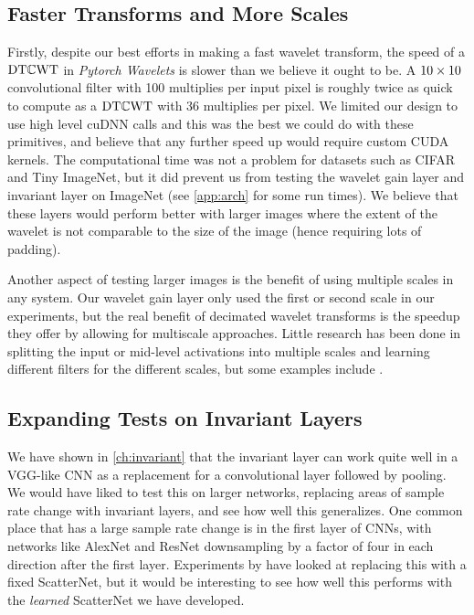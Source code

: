\subsection{Faster Transforms and More Scales}
Firstly, despite our best efforts in making a fast wavelet transform, the speed
of a $\mathrm{DT}\mathbb{C}\mathrm{WT}$ in \emph{Pytorch Wavelets} is slower than we believe it ought to be. A $10\times 10$
convolutional filter with 100 multiplies per input pixel is roughly twice as
quick to compute as a $\mathrm{DT}\mathbb{C}\mathrm{WT}$ with 36 multiplies per pixel. We limited our
design to use high level cuDNN calls and this was the best we could do with
these primitives, and believe that any further speed up would require custom CUDA
kernels. The computational time was not a problem for datasets such as CIFAR and Tiny
ImageNet, but it did prevent us from testing the wavelet gain layer and
invariant layer on ImageNet (see \autoref{app:arch} for some run times).
We believe that these layers would perform better with larger images where the
extent of the wavelet is not comparable to the size of the image (hence
requiring lots of padding).

Another aspect of testing larger images is the benefit of using multiple
scales in any system. Our wavelet gain layer only used the first or second scale
in our experiments, but the real benefit of decimated wavelet transforms is the
speedup they offer by allowing for multiscale approaches. Little research has
been done in splitting the input or mid-level activations into multiple scales
and learning different filters for the different scales, but some examples
include \cite{haber_learning_2017, fujieda_wavelet_2018}.

\subsection{Expanding Tests on Invariant Layers}
We have shown in \autoref{ch:invariant} that the invariant layer can work quite
well in a VGG-like CNN as a replacement for a convolutional layer followed by 
pooling. We would have liked to test this on larger networks, replacing areas of
sample rate change with invariant layers, and see how well
this generalizes. One common place that has a large sample rate change is in the first layer of 
CNNs, with networks like AlexNet and ResNet downsampling by a
factor of four in each direction after the first layer. Experiments by
\citeauthor{oyallon_scaling_2017} \cite{oyallon_scaling_2017} have looked at replacing this with a fixed
ScatterNet, but it would be interesting to see how well this performs with the
\emph{learned} ScatterNet we have developed.

